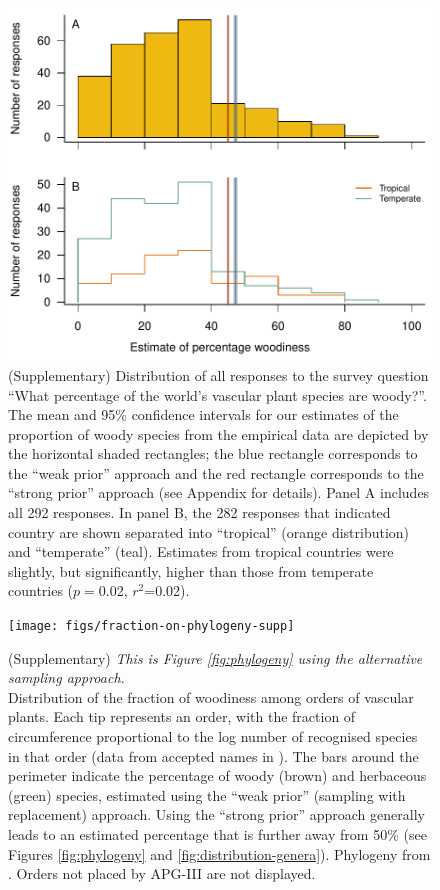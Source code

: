 \documentclass[a4paper,12pt]{article}
\begin{document}
\begin{figure}[p]
  \centering
  \includegraphics{figs/survey-distribution}
  \caption{(Supplementary) Distribution of all responses to the survey
    question ``What percentage of the world's vascular plant species
    are woody?''.
    The mean and 95\% confidence intervals for our estimates of the
    proportion of woody species from the empirical data are depicted
    by the horizontal shaded rectangles; the blue rectangle
    corresponds to the ``weak prior'' approach and the red rectangle
    corresponds to the ``strong prior'' approach (see Appendix for
    details).  
    Panel A includes all 292 responses.  In panel B, the 282
    responses that indicated country are shown separated into
    ``tropical'' (orange distribution) and ``temperate'' (teal).
    Estimates from tropical countries were slightly, but
    significantly, higher than those from temperate countries
    ($p=$0.02, $r^2$=0.02).
  }

  \label{fig:survey-distribution}
\end{figure}

\begin{figure}[p]
  \centering
  \texttt{[image: figs/fraction-on-phylogeny-supp]}

  \caption{(Supplementary)
    \textit{This is Figure \ref{fig:phylogeny} using the alternative
      sampling approach.}\\
    Distribution of the fraction of woodiness among orders of vascular
    plants.  Each tip represents an order, with the fraction of
    circumference proportional to the log number of recognised species
    in that order (data from accepted names in \citet{ThePlantList}).
    The bars around the perimeter indicate the percentage of woody
    (brown) and herbaceous (green) species, estimated using the ``weak
    prior'' (sampling with replacement) approach.  Using the ``strong
    prior'' approach generally leads to an estimated percentage that
    is further away from 50\% (see Figures \ref{fig:phylogeny} and
    \ref{fig:distribution-genera}).  Phylogeny from \citep{Zanne}.
    Orders not placed by APG-III \citep{APG3} are not displayed.}
  \label{fig:phylogeny-supp}
\end{figure}
\end{document}
